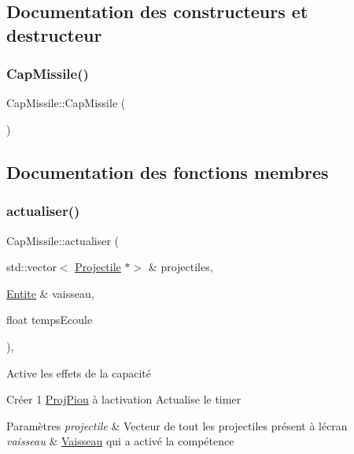 \subsection{Documentation des constructeurs et destructeur}
\mbox{\label{class_cap_missile_a82f039eadaaba1712780a56598daae2a}} 
\subsubsection{\texorpdfstring{Cap\+Missile()}{CapMissile()}}
{\footnotesize\ttfamily Cap\+Missile\+::\+Cap\+Missile (\begin{DoxyParamCaption}{ }\end{DoxyParamCaption})}



\subsection{Documentation des fonctions membres}
\mbox{\label{class_cap_missile_adcb6a35330589c49910e6dd6cc7f2f7d}} 
\subsubsection{\texorpdfstring{actualiser()}{actualiser()}}
{\footnotesize\ttfamily Cap\+Missile\+::actualiser (\begin{DoxyParamCaption}\item[{std\+::vector$<$ \hyperlink{class_projectile}{Projectile} $\ast$$>$ \&}]{projectiles,  }\item[{\hyperlink{class_entite}{Entite} \&}]{vaisseau,  }\item[{float}]{temps\+Ecoule }\end{DoxyParamCaption})\hspace{0.3cm}{\ttfamily [override]}, {\ttfamily [virtual]}}



Active les effets de la capacité 

Créer 1 \hyperlink{class_proj_piou}{Proj\+Piou} à l\textquotesingle{}activation Actualise le timer 
\begin{DoxyParams}{Paramètres}
{\em projectile} & Vecteur de tout les projectiles présent à l\textquotesingle{}écran \\
\hline
{\em vaisseau} & \hyperlink{class_vaisseau}{Vaisseau} qui a activé la compétence \\
\hline
\end{DoxyParams}


